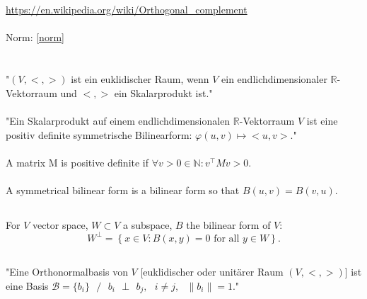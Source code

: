 \documentclass{report}
\newcommand{\vphi}{\varphi}
\begin{document}
\section{}

\url{https://en.wikipedia.org/wiki/Orthogonal_complement}
\\
\\
Norm: \ref{norm}

\section{}

\subsection{}

"$(V,<,>)$ ist ein euklidischer Raum, wenn $V$ ein endlichdimensionaler $\mathbb{R}$-Vektorraum und $<,>$ ein Skalarprodukt ist."
\\
\\
"Ein Skalarprodukt auf einem endlichdimensionalen $\mathbb{R}$-Vektorraum $V$ ist eine positiv definite symmetrische Bilinearform: $\vphi(u,v)\mapsto<u,v>$."
\\
\\
\label{posdef}A matrix M is positive definite if $\forall v>0\in \mathbb{N}: v^\top M v > 0$.
\\
\\
A symmetrical bilinear form is a bilinear form so that $B(u,v)=B(v,u)$.

\subsection{}
For $V$ vector space, $W\subset V$ a subspace, $B$ the bilinear form of $V$:
$$W^{\bot }=\left\{x\in V:B(x,y)=0{\mbox{ for all }}y\in W\right\}.$$

\subsection{}

"Eine Orthonormalbasis von $V$ [euklidischer oder unit\"arer Raum $(V,<,>)$] ist eine Basis $\mathcal{B} = \{b_i\}\textrm{ } /\textrm{ }  b_i\textrm{ }\bot\textrm{ }b_j,\textrm{ } i\neq j,\textrm{ } \|b_i\|=1$."

\subsection{}
\end{document}

